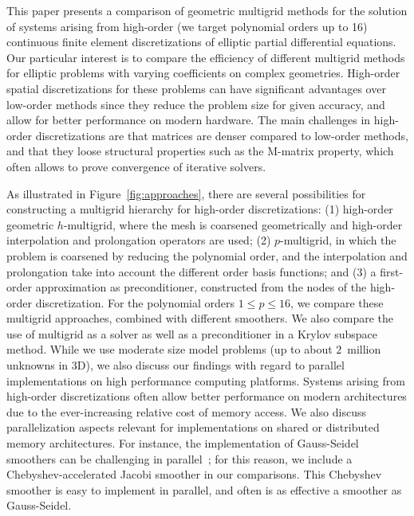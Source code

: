 \documentclass[smallcondensed,final]{svjour3}     %
\begin{document}
This paper presents a comparison of geometric multigrid
methods for the solution of systems arising from high-order (we target
polynomial orders up to 16) continuous finite element discretizations
of elliptic partial differential equations. Our particular interest is
to compare the efficiency of different multigrid methods for elliptic
problems with varying coefficients on complex geometries.
High-order spatial discretizations for these problems can have significant advantages
over low-order methods since they reduce the problem size for given
accuracy, and allow for better performance on modern hardware.
The main challenges in high-order discretizations are that matrices
are denser compared to low-order methods, and that they loose structural
properties such as the M-matrix
property, which often allows to prove convergence of iterative
solvers.

As illustrated in Figure~\ref{fig:approaches}, there are several
possibilities for constructing a multigrid hierarchy for high-order
discretizations: (1) high-order geometric $h$-multigrid, where the
mesh is coarsened geometrically and high-order interpolation and
prolongation operators are used; (2) $p$-multigrid, in which the
problem is coarsened by reducing the polynomial order, and the
interpolation and prolongation take into account the different order
basis functions; and (3) a first-order approximation as
preconditioner, constructed from the nodes of the high-order
discretization.
For the polynomial orders $1\le p\le 16$, we
compare these multigrid approaches, combined with different
smoothers. We also compare the use of multigrid as a solver as well as a preconditioner
in a Krylov subspace method.  While we use moderate size model
problems (up to about $2$~million unknowns in 3D), we also discuss our findings with regard to parallel
implementations on high performance computing platforms. 
Systems arising from high-order discretizations often allow better performance on 
modern architectures due to the ever-increasing relative cost of memory access.
We also discuss parallelization aspects relevant for implementations on
shared or distributed memory architectures. For instance, the
implementation of Gauss-Seidel smoothers can be challenging in
parallel~\cite{AdamsBrezinaHuEtAl03, BakerFalgoutKolevEtAl11}; for
this reason, we include a Chebyshev-accelerated Jacobi smoother in our
comparisons. This Chebyshev smoother is easy to implement in parallel,
and often is as effective a smoother as Gauss-Seidel.
\end{document}

